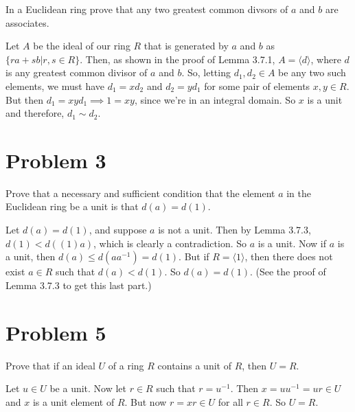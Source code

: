 \documentclass[12pt]{article}
\begin{document}
In a Euclidean ring prove that any two greatest common divsors of $a$ and $b$ are associates.

Let $A$ be the ideal of our ring $R$ that is generated by $a$ and $b$ as $\{ra+sb|r,s\in R\}$.
Then, as shown in the proof of Lemma 3.7.1, $A=\langle d\rangle$, where $d$ is any greatest common
divisor of $a$ and $b$.  So, letting $d_1,d_2\in A$ be any two such elements, we must have
$d_1=xd_2$ and $d_2=yd_1$ for some pair of elements $x,y\in R$.  But then $d_1=xyd_1\implies 1=xy$,
since we're in an integral domain.  So $x$ is a unit and therefore, $d_1\sim d_2$.

\section*{Problem 3}

Prove that a necessary and sufficient condition that the element $a$ in the Euclidean ring be a unit is that $d(a)=d(1)$.

Let $d(a)=d(1)$, and suppose $a$ is not a unit.  Then by Lemma 3.7.3, $d(1)<d((1)a)$, which is clearly a contradiction.
So $a$ is a unit.  Now if $a$ is a unit, then $d(a)\leq d(aa^{-1})=d(1)$.  But if $R=\langle 1\rangle$, then there does
not exist $a\in R$ such that $d(a)<d(1)$.  So $d(a)=d(1)$.  (See the proof of Lemma 3.7.3 to get this last part.)

\section*{Problem 5}

Prove that if an ideal $U$ of a ring $R$ contains a unit of $R$, then $U=R$.

Let $u\in U$ be a unit.  Now let $r\in R$ such that $r=u^{-1}$.
Then $x=uu^{-1}=ur\in U$ and $x$ is a unit element of $R$.
But now $r=xr\in U$ for all $r\in R$.  So $U=R$.
\end{document}

